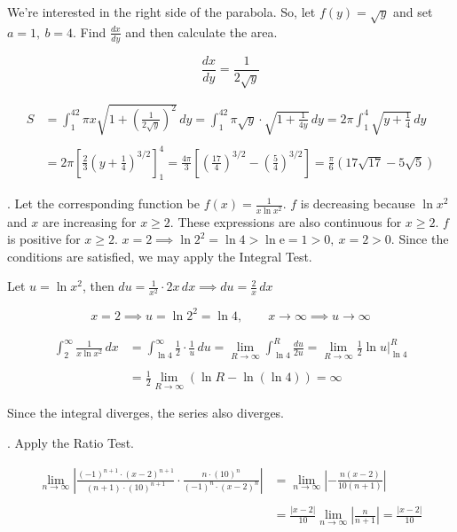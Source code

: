 \documentclass{article}
\begin{document}
\hfill

\noindent We're interested in the right side of the parabola. So, let $f(y)=\sqrt{y}$ and set $a=1,\:b=4$. Find $\displaystyle\frac{dx}{dy}$ and then calculate the area.

\[\frac{dx}{dy}=\frac1{2\sqrt y}\]

\begin{align*}S&=\int_1^42\pi x\sqrt{1+\left(\frac1{2\sqrt y}\right)^2}\,dy=\int_1^42\pi\sqrt y\cdot\sqrt{1+\frac1{4y}}\,dy=2\pi\int_1^4\sqrt{y+\frac14}\,dy\\\\&=2\pi\left[\frac23\left(y+\frac14\right)^{3/2}\right]_1^4=\frac{4\pi}3\left[\left(\frac{17}4\right)^{3/2}-\left(\frac54\right)^{3/2}\right]=\boxed{\frac\pi6\left(17\sqrt{17}-5\sqrt5\right)}\end{align*}

\hfill

. Let the corresponding function be $\displaystyle f(x)=\frac1{x\ln x^2}$. $f$ is decreasing because $\ln x^2$ and $x$ are increasing for $x\geq2$. These expressions are also continuous for $x\geq2$. $f$ is positive for $x\geq2$. $x=2\implies\ln2^2=\ln4>\ln\mathrm{e}=1>0,\: x=2>0$. Since the conditions are satisfied, we may apply the Integral Test.

\hfill

\noindent Let $u=\ln x^2$, then $\displaystyle du=\frac1{x^2}\cdot 2x\,dx\implies du=\frac2x\,dx$

\[x=2\implies u=\ln2^2=\ln4,\qquad x\to\infty\implies u\to\infty\]

\begin{align*}\int_2^{\infty}\frac1{x\ln x^2}\,dx&=\int_{\ln 4}^{\infty}\frac12\cdot\frac1{u}\,du=\lim_{R\to\infty}\int_{\ln4}^R\frac{du}{2u}=\lim_{R\to\infty}\frac12\ln u\bigg|_{\ln4}^R\\\\&=\frac12\lim_{R\to\infty}\left(\ln R-\ln(\ln 4)\right)=\boxed{\infty}\end{align*}

\hfill

\noindent Since the integral diverges, the series also diverges.

\newpage

. Apply the Ratio Test.

\begin{align*}
\lim_{n\to\infty}\left|\frac{(-1)^{n+1}\cdot(x-2)^{n+1}}{(n+1)\cdot(10)^{n+1}}\cdot\frac{n\cdot(10)^n}{(-1)^n\cdot(x-2)^n}\right|&=\lim_{n\to\infty}\left|-\frac{n(x-2)}{10(n+1)}\right|\\\\&=\frac{|x-2|}{10}\lim_{n\to\infty}\left|\frac n{n+1}\right|=\frac{|x-2|}{10}
\end{align*}
\end{document}
